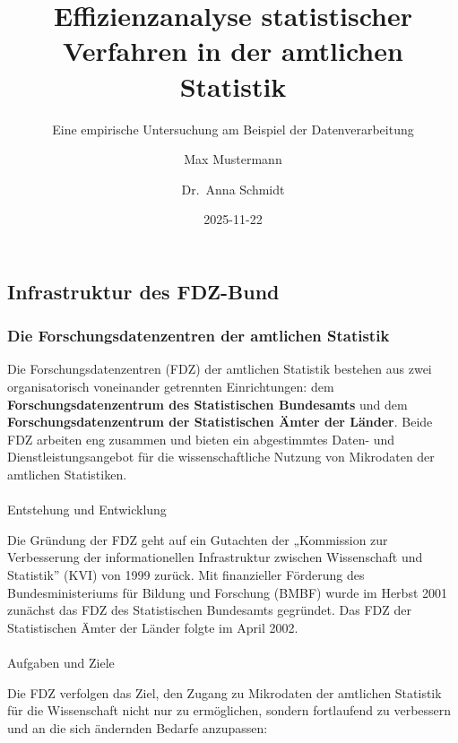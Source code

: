 \documentclass[
  ngerman,
  10pt,
  twocolumn]{article}
\title{Effizienzanalyse statistischer Verfahren in der amtlichen
Statistik}
\subtitle{Eine empirische Untersuchung am Beispiel der
Datenverarbeitung}
\author{Max Mustermann \and Dr.~Anna Schmidt}
\date{2025-11-22}
\makeatletter
\let\oldparagraph\paragraph
\renewcommand{\paragraph}{
    \@ifstar
      \xxxParagraphStar
      \xxxParagraphNoStar
  }
\newcommand{\xxxParagraphStar}[1]{\oldparagraph*{#1}\mbox{}}
\newcommand{\xxxParagraphNoStar}[1]{\oldparagraph{#1}\mbox{}}
\makeatother
\begin{document}
\maketitle


\subsection{Infrastruktur des FDZ-Bund}\label{sec-infrastruktur}

\subsubsection{Die Forschungsdatenzentren der amtlichen
Statistik}\label{die-forschungsdatenzentren-der-amtlichen-statistik}

Die Forschungsdatenzentren (FDZ) der amtlichen Statistik bestehen aus
zwei organisatorisch voneinander getrennten Einrichtungen: dem
\textbf{Forschungsdatenzentrum des Statistischen Bundesamts} und dem
\textbf{Forschungsdatenzentrum der Statistischen Ämter der Länder}.
Beide FDZ arbeiten eng zusammen und bieten ein abgestimmtes Daten- und
Dienstleistungsangebot für die wissenschaftliche Nutzung von Mikrodaten
der amtlichen Statistiken.

\paragraph{Entstehung und Entwicklung}\label{entstehung-und-entwicklung}

Die Gründung der FDZ geht auf ein Gutachten der „Kommission zur
Verbesserung der informationellen Infrastruktur zwischen Wissenschaft
und Statistik'' (KVI) von 1999 zurück. Mit finanzieller Förderung des
Bundesministeriums für Bildung und Forschung (BMBF) wurde im Herbst 2001
zunächst das FDZ des Statistischen Bundesamts gegründet. Das FDZ der
Statistischen Ämter der Länder folgte im April 2002.

\paragraph{Aufgaben und Ziele}\label{aufgaben-und-ziele}

Die FDZ verfolgen das Ziel, den Zugang zu Mikrodaten der amtlichen
Statistik für die Wissenschaft nicht nur zu ermöglichen, sondern
fortlaufend zu verbessern und an die sich ändernden Bedarfe anzupassen:
\end{document}
